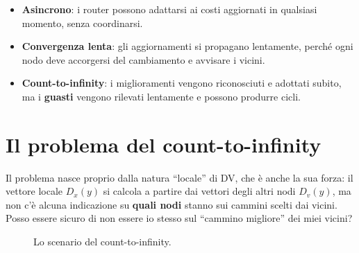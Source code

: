 \begin{itemize}
    \item[\itick] \textbf{Asincrono}: i router possono adattarsi ai costi aggiornati in qualsiasi momento, senza coordinarsi.
    \item[\icross] \textbf{Convergenza lenta}: gli aggiornamenti si propagano lentamente, perché ogni nodo deve accorgersi del
          cambiamento e avvisare i vicini.
    \item[\icross] \textbf{Count-to-infinity}: i miglioramenti vengono riconosciuti e adottati subito, ma i \textbf{guasti} vengono
          rilevati lentamente e possono produrre cicli.
\end{itemize}

\section{Il problema del count-to-infinity}

Il problema nasce proprio dalla natura ``locale'' di DV, che è anche la sua forza: il vettore locale $D_x(y)$ si calcola a
partire dai vettori degli altri nodi $D_v(y)$, ma non c'è alcuna indicazione su \textbf{quali nodi} stanno sui cammini scelti
dai vicini. Posso essere sicuro di non essere io stesso sul ``cammino migliore'' dei miei vicini?

\begin{figure}[H]
\centering
{}
\caption{Lo scenario del count-to-infinity.}
\end{figure}

